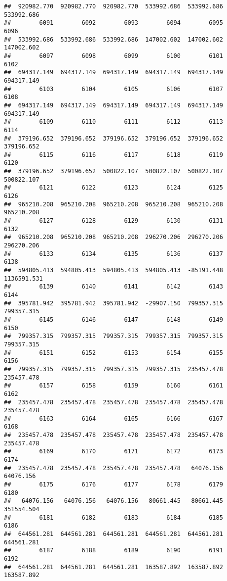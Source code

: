 \documentclass[
]{book}
\begin{document}
\begin{verbatim}
##  920982.770  920982.770  920982.770  533992.686  533992.686  533992.686 
##        6091        6092        6093        6094        6095        6096 
##  533992.686  533992.686  533992.686  147002.602  147002.602  147002.602 
##        6097        6098        6099        6100        6101        6102 
##  694317.149  694317.149  694317.149  694317.149  694317.149  694317.149 
##        6103        6104        6105        6106        6107        6108 
##  694317.149  694317.149  694317.149  694317.149  694317.149  694317.149 
##        6109        6110        6111        6112        6113        6114 
##  379196.652  379196.652  379196.652  379196.652  379196.652  379196.652 
##        6115        6116        6117        6118        6119        6120 
##  379196.652  379196.652  500822.107  500822.107  500822.107  500822.107 
##        6121        6122        6123        6124        6125        6126 
##  965210.208  965210.208  965210.208  965210.208  965210.208  965210.208 
##        6127        6128        6129        6130        6131        6132 
##  965210.208  965210.208  965210.208  296270.206  296270.206  296270.206 
##        6133        6134        6135        6136        6137        6138 
##  594805.413  594805.413  594805.413  594805.413  -85191.448 1136591.531 
##        6139        6140        6141        6142        6143        6144 
##  395781.942  395781.942  395781.942  -29907.150  799357.315  799357.315 
##        6145        6146        6147        6148        6149        6150 
##  799357.315  799357.315  799357.315  799357.315  799357.315  799357.315 
##        6151        6152        6153        6154        6155        6156 
##  799357.315  799357.315  799357.315  799357.315  235457.478  235457.478 
##        6157        6158        6159        6160        6161        6162 
##  235457.478  235457.478  235457.478  235457.478  235457.478  235457.478 
##        6163        6164        6165        6166        6167        6168 
##  235457.478  235457.478  235457.478  235457.478  235457.478  235457.478 
##        6169        6170        6171        6172        6173        6174 
##  235457.478  235457.478  235457.478  235457.478   64076.156   64076.156 
##        6175        6176        6177        6178        6179        6180 
##   64076.156   64076.156   64076.156   80661.445   80661.445  351554.504 
##        6181        6182        6183        6184        6185        6186 
##  644561.281  644561.281  644561.281  644561.281  644561.281  644561.281 
##        6187        6188        6189        6190        6191        6192 
##  644561.281  644561.281  644561.281  163587.892  163587.892  163587.892 

\end{verbatim}
\end{document}
